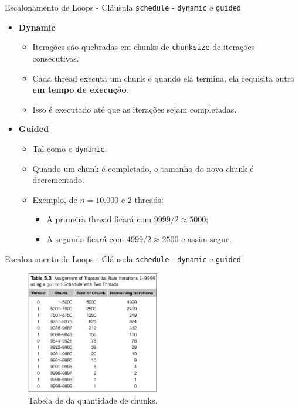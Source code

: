 	
	\begin{frame}{Escalonamento de Loops - Cláusula {\tt schedule} - {\tt dynamic} e {\tt guided}}
		\begin{itemize}
			\setlength\itemsep{1.2em}
			\item \textbf{Dynamic}
			\begin{itemize}
				\setlength\itemsep{0.7em}
				\item Iterações são quebradas em chunks de {\tt chunksize} de iterações consecutivas.
				\item Cada thread executa um chunk e quando ela termina, ela requisita outro {\bf em tempo de execução}.
				\item Isso é executado até que as iterações sejam completadas.
			\end{itemize}
			\item \textbf{Guided}
			\begin{itemize}
				\setlength\itemsep{0.5em}
				\item Tal como o {\tt dynamic}.
				\item Quando um chunk é completado, o tamanho do novo chunk é decrementado.
				\item Exemplo, de $n=10.000$ e 2 threads: 
				\begin{itemize}
					\item A primeira thread ficará com $9999/2 \approx 5000$;
					\item A segunda ficará com $4999/2 \approx 2500$ e assim segue.
				\end{itemize}
			\end{itemize}
		\end{itemize}
	\end{frame}

	\begin{frame}{Escalonamento de Loops - Cláusula {\tt schedule} - {\tt dynamic} e {\tt guided}}
		\begin{figure}[p]
			\centering
			\includegraphics[width=0.52\textwidth]{img/pacheco/dynamic-guided.png}
			\caption{Tabela de da quantidade de chunks.}
		\end{figure}
	\end{frame}

